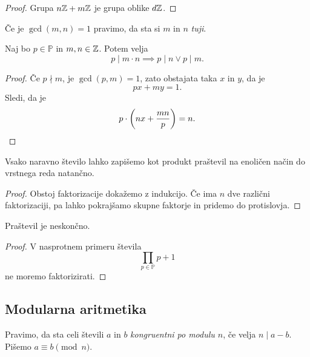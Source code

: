 \begin{proof}
Grupa $n \mathbb{Z} + m \mathbb{Z}$ je grupa oblike $d \mathbb{Z}$.
\end{proof}

\begin{definicija}
Če je $\gcd(m,n) = 1$ pravimo, da sta si $m$ in $n$
\emph{tuji}.
\end{definicija}

\begin{lema}[Evklid]
Naj bo $p \in \mathbb{P}$ in $m, n \in \mathbb{Z}$. Potem velja
\[
p \mid m \cdot n \implies p \mid n \lor p \mid m.
\]
\end{lema}

\begin{proof}
Če $p \nmid m$, je $\gcd(p,m) = 1$, zato obstajata taka $x$ in $y$,
da je
\[
px + my = 1.
\]
Sledi, da je
\[
p \cdot \left(nx + \frac{mn}{p} \right) = n. \qedhere
\]
\end{proof}


\begin{izrek}
Vsako naravno število lahko zapišemo kot produkt praštevil na
enoličen način do vrstnega reda natančno.
\end{izrek}

\begin{proof}
Obstoj faktorizacije dokažemo z indukcijo. Če ima $n$ dve različni
faktorizaciji, pa lahko pokrajšamo skupne faktorje in pridemo do
protislovja.
\end{proof}

\begin{izrek}[Evklid]
Praštevil je neskončno.
\end{izrek}

\begin{proof}
V nasprotnem primeru števila
\[
\prod_{p \in \mathbb{P}} p + 1
\]
ne moremo faktorizirati.
\end{proof}

\newpage

\subsection{Modularna aritmetika}

\begin{okvir}
\begin{definicija}
Pravimo, da sta celi števili $a$ in $b$
\emph{kongruentni po modulu $n$}, če velja
$n \mid a-b$. Pišemo $a \equiv b \pmod{n}$.
\end{definicija}
\end{okvir}

